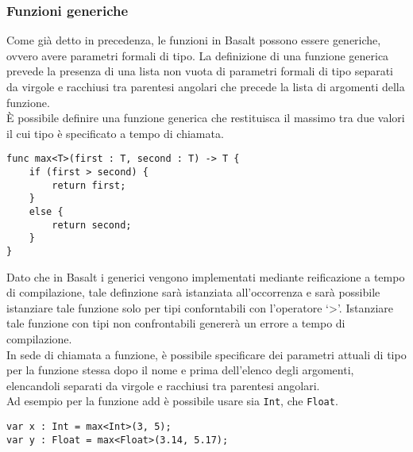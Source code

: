 \subsubsection{Funzioni generiche}
Come già detto in precedenza, le funzioni in Basalt possono essere generiche, 
ovvero avere parametri formali di tipo. La definizione di una funzione generica 
prevede la presenza di una lista non vuota di parametri formali di tipo separati da 
virgole e racchiusi tra parentesi angolari che precede la lista di argomenti 
della funzione. \\

È possibile definire una funzione generica che restituisca il massimo tra due valori 
il cui tipo è specificato a tempo di chiamata.

\vspace{0.5cm}
\begin{lstlisting}[frame=single]
func max<T>(first : T, second : T) -> T {
    if (first > second) {
        return first; 
    }
    else {
        return second;
    }
}
\end{lstlisting}
\vspace{0.5cm}


Dato che in Basalt i generici vengono implementati mediante reificazione a tempo 
di compilazione, tale definzione sarà istanziata all’occorrenza e sarà possibile 
istanziare tale funzione solo per tipi conforntabili con l’operatore ‘>’. 
Istanziare tale funzione con tipi non confrontabili genererà un errore a tempo 
di compilazione. \\

In sede di chiamata a funzione, è possibile specificare dei parametri attuali di 
tipo per la funzione stessa dopo il nome e prima dell’elenco degli argomenti, 
elencandoli separati da virgole e racchiusi tra parentesi angolari. \\

Ad esempio per la funzione add è possibile usare sia \texttt{Int}, che \texttt{Float}.

\vspace{0.5cm}
\begin{lstlisting}[frame=single]
var x : Int = max<Int>(3, 5);
var y : Float = max<Float>(3.14, 5.17);
\end{lstlisting}
\vspace{0.5cm}